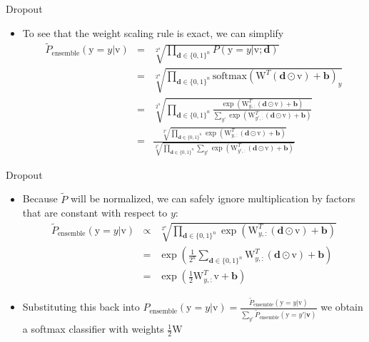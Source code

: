 \documentclass[10pt]{beamer}
\begin{document}
	\begin{frame}{Dropout}
		\begin{itemize}
			\item To see that the weight scaling rule is exact, we can simplify 
			\pause
			\begin{eqnarray*}
				\tilde{P}_{\text{ensemble}}\left(\mathrm{y}=y|\bm{\mathrm{v}}\right)&=&\sqrt[2^n]{\prod_{\bm{d}\in\{0,1\}^n}P\left(\mathrm{y}=y|\bm{\mathrm{v}};\bm{d}\right)}\\
				&=&\sqrt[2^n]{\prod_{\bm{d}\in\{0,1\}^n}\text{softmax}\left(\bm{\mathrm{W}}^T(\bm{d}\odot\bm{\mathrm{v}})+\bm{b}\right)_y}\\
				&=&\sqrt[2^n]{\prod_{\bm{d}\in\{0,1\}^n}\frac{\exp\left(\bm{\mathrm{W}}^T_{y,:}\left(\bm{d}\odot\bm{\mathrm{v}}\right)+\bm{b}\right)}{\sum_{y'}\exp\left(\bm{\mathrm{W}}^T_{y',:}\left(\bm{d}\odot\bm{\mathrm{v}}\right)+\bm{b}\right)}}\\
				&=&\frac{\sqrt[2^n]{\prod_{\bm{d}\in\{0,1\}^n}\exp\left(\bm{\mathrm{W}}^T_{y,:}\left(\bm{d}\odot\bm{\mathrm{v}}\right)+\bm{b}\right)}}{\sqrt[2^n]{\prod_{\bm{d}\in\{0,1\}^n}\sum_{y'}\exp\left(\bm{\mathrm{W}}^T_{y',:}\left(\bm{d}\odot\bm{\mathrm{v}}\right)+\bm{b}\right)}}
			\end{eqnarray*}
		\end{itemize}
	\end{frame}
	
	\begin{frame}{Dropout}
		\begin{itemize}
			\item Because $\tilde{P}$ will be normalized, we can safely ignore multiplication by factors that are constant with respect to $y$:
			\pause
			\begin{eqnarray*}
				\tilde{P}_{\text{ensemble}}(\mathrm{y}=y|\bm{\mathrm{v}})&\propto&\sqrt[2^n]{\prod_{\bm{d}\in\{0,1\}^n}\exp\left(\bm{\mathrm{W}}^T_{y,:}\left(\bm{d}\odot\bm{\mathrm{v}}\right)+\bm{b}\right)}\\
				&=&\exp\left(\frac{1}{2^n}\sum_{\bm{d}\in\{0,1\}^n}\bm{\mathrm{W}}^T_{y,:}\left(\bm{d}\odot\bm{\mathrm{v}}\right)+\bm{b}\right)\\
				&=&\exp\left(\frac{1}{2}\bm{\mathrm{W}}^T_{y,:}\bm{\mathrm{v}}+\bm{b}\right)
			\end{eqnarray*}
			\pause
			\item Substituting this back into $P_{\text{ensemble}}(\mathrm{y}=y|\bm{\mathrm{v}})=\frac{\tilde{P}_{\text{ensemble}}(\mathrm{y}=y|\bm{\mathrm{v}})}{\sum_{y'}\tilde{P}_{\text{ensemble}}(\mathrm{y}=y'|\bm{v})}$ we obtain a softmax classifier with weights $\frac{1}{2}\bm{\mathrm{W}}$
		\end{itemize}
	\end{frame}
	
\end{document}
